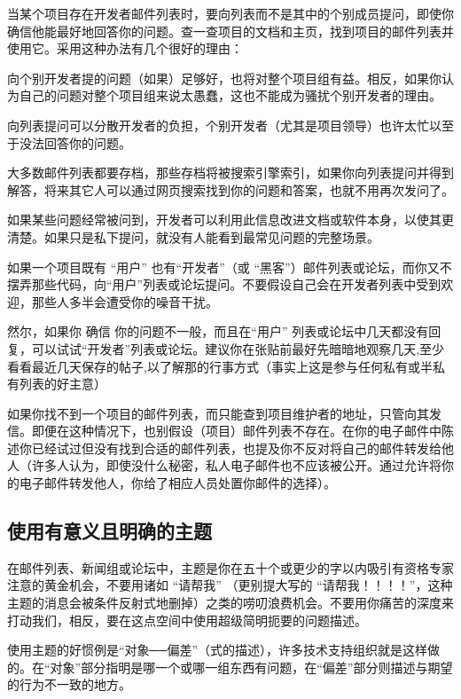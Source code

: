 当某个项目存在开发者邮件列表时，要向列表而不是其中的个别成员提问，即使你确信他能最好地回答你的问题。查一查项目的文档和主页，找到项目的邮件列表并使用它。采用这种办法有几个很好的理由：


\begin{compactitem}
\item 向个别开发者提的问题（如果）足够好，也将对整个项目组有益。相反，如果你认为自己的问题对整个项目组来说太愚蠢，这也不能成为骚扰个别开发者的理由。
\item 向列表提问可以分散开发者的负担，个别开发者（尤其是项目领导）也许太忙以至于没法回答你的问题。
\item 大多数邮件列表都要存档，那些存档将被搜索引擎索引，如果你向列表提问并得到解答，将来其它人可以通过网页搜索找到你的问题和答案，也就不用再次发问了。
\item 如果某些问题经常被问到，开发者可以利用此信息改进文档或软件本身，以使其更清楚。如果只是私下提问，就没有人能看到最常见问题的完整场景。
\end{compactitem}

如果一个项目既有 “用户” 也有“开发者”（或 “黑客”）邮件列表或论坛，而你又不摆弄那些代码，向“用户”列表或论坛提问。不要假设自己会在开发者列表中受到欢迎，那些人多半会遭受你的噪音干扰。

然尔，如果你 确信 你的问题不一般，而且在“用户” 列表或论坛中几天都没有回复，可以试试“开发者”列表或论坛。建议你在张贴前最好先暗暗地观察几天,至少看看最近几天保存的帖子,以了解那的行事方式（事实上这是参与任何私有或半私有列表的好主意）

如果你找不到一个项目的邮件列表，而只能查到项目维护者的地址，只管向其发信。即便在这种情况下，也别假设（项目）邮件列表不存在。在你的电子邮件中陈述你已经试过但没有找到合适的邮件列表，也提及你不反对将自己的邮件转发给他人（许多人认为，即使没什么秘密，私人电子邮件也不应该被公开。通过允许将你的电子邮件转发他人，你给了相应人员处置你邮件的选择）。





\subsection{使用有意义且明确的主题}

在邮件列表、新闻组或论坛中，主题是你在五十个或更少的字以内吸引有资格专家注意的黄金机会，不要用诸如 “请帮我” （更别提大写的 “请帮我！！！！”，这种主题的消息会被条件反射式地删掉）之类的唠叨浪费机会。不要用你痛苦的深度来打动我们，相反，要在这点空间中使用超级简明扼要的问题描述。

使用主题的好惯例是“对象──偏差”（式的描述），许多技术支持组织就是这样做的。在“对象”部分指明是哪一个或哪一组东西有问题，在“偏差”部分则描述与期望的行为不一致的地方。

